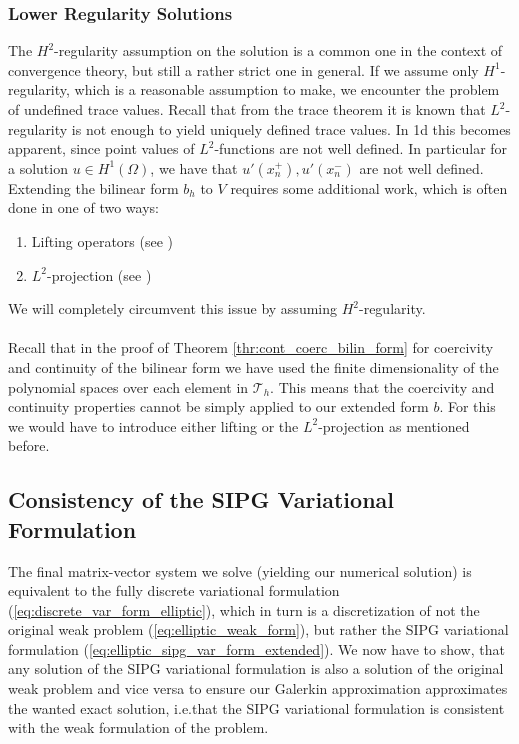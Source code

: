 \subsubsection*{Lower Regularity Solutions}
The $H^2$-regularity assumption on the solution is a common one in the context of convergence theory, but still a rather strict one in general. 
If we assume only $H^1$-regularity, which is a reasonable assumption to make, we encounter the problem of undefined trace values. Recall that 
from the trace theorem it is known that $L^2$-regularity is not enough to yield uniquely defined trace values. In 1d this becomes apparent, since 
point values of $L^2$-functions are not well defined. In particular for a solution $u \in H^1(\Omega)$, we have that $u'(x_n^+), u'(x_n^-)$ 
are not well defined. Extending the bilinear form $b_h$ to $V$ requires some additional work, which is often done in one of two ways:
\begin{enumerate}
    \item Lifting operators	(see \cite{grote2006})
    \item $L^2$-projection	(see \cite{georgoulis2011Springer})
\end{enumerate}
We will completely circumvent this issue by assuming $H^2$-regularity. \\ \\
Recall that in the proof of Theorem \ref{thr:cont_coerc_bilin_form} for coercivity and continuity of the bilinear form we have used the finite 
dimensionality of the polynomial spaces over each element in $\mathcal{T}_h$. This means that the coercivity and continuity properties cannot be simply 
applied to our extended form $b$. For this we would have to introduce either lifting or the $L^2$-projection as mentioned before.

\subsection{Consistency of the SIPG Variational Formulation}
The final matrix-vector system we solve (yielding our numerical solution) is equivalent to the fully 
discrete variational formulation (\ref{eq:discrete_var_form_elliptic}), which in turn is a discretization of not the original weak problem 
(\ref{eq:elliptic_weak_form}), but rather the SIPG variational formulation (\ref{eq:elliptic_sipg_var_form_extended}).
We now have to show, that any solution of the SIPG variational formulation is also a solution of the original weak problem and vice versa to ensure 
our Galerkin approximation approximates the wanted exact solution, i.e.\@ that the SIPG variational formulation is consistent with the weak 
formulation of the problem.


